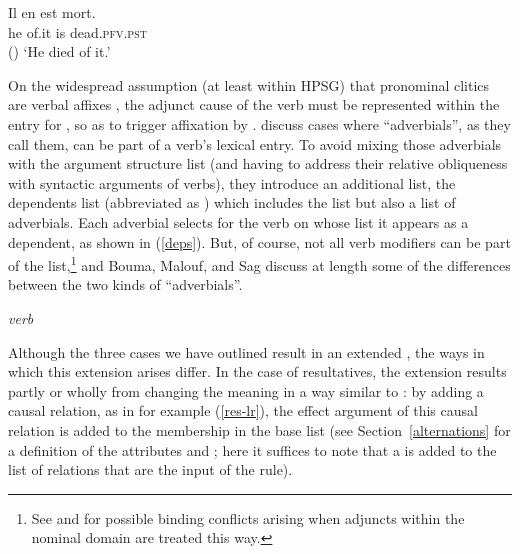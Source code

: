 \documentclass[output=paper
 	        ,biblatex
                ,babelshorthands
                ,newtxmath
                ,draftmode
                ,colorlinks, citecolor=brown
]{langscibook}
\begin{document}
\ea
\label{mourir}
\gll Il en est mort. \\
     he of.it is dead.\textsc{pfv.pst} \\\hfill()
\glt `He died of it.'
\z

\noindent
On the widespread assumption (at least within HPSG) that pronominal clitics are verbal affixes \citep{MillerandSag1997}, the adjunct cause of the verb  must be represented within the entry for , so as to trigger affixation by . \citet{Boumaetal2001} discuss cases where ``adverbials'', as they call them, can be part of a verb's lexical entry. To avoid mixing those adverbials with the argument structure list (and having to address their relative obliqueness with syntactic arguments of verbs), they introduce  an additional list, the dependents list (abbreviated as \deps) which includes the \argst list but also a list of adverbials. Each adverbial selects for the verb on whose \deps list it appears as a dependent, as shown in (\ref{deps}). But, of course, not all verb modifiers can be part of the \deps list,\footnote{%
See  and  for possible binding conflicts arising when adjuncts within the nominal domain are treated this way.
} and Bouma, Malouf, and Sag discuss at length some of the differences between the two kinds of ``adverbials''.

\begin{exe}
\ex\label{deps}
\emph{verb} \impl
{}
\end{exe}

Although the three cases we have outlined result in an extended \argst, the ways in which this extension arises differ. In the case of resultatives, the extension results partly or wholly from changing the meaning in a way similar to \citet{RappaportandLevin1998}: by adding a causal relation, as in for example (\ref{res-lr}), the effect argument of this causal relation is added to the membership in the base \argst list (see Section~\ref{alternations} for a definition of the attributes  and ; here it suffices to note that a  is added to the list of relations that are the input of the rule). 
\end{document}
